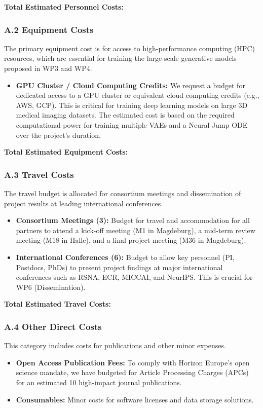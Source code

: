 \textbf{Total Estimated Personnel Costs: }

\subsubsection*{A.2 Equipment Costs}
The primary equipment cost is for access to high-performance computing (HPC) resources, which are essential for training the large-scale generative models proposed in WP3 and WP4.
\begin{itemize}
    \item \textbf{GPU Cluster / Cloud Computing Credits:} We request a budget for dedicated access to a GPU cluster or equivalent cloud computing credits (e.g., AWS, GCP). This is critical for training deep learning models on large 3D medical imaging datasets. The estimated cost is based on the required computational power for training multiple VAEs and a Neural Jump ODE over the project's duration.
\end{itemize}

\textbf{Total Estimated Equipment Costs: }

\subsubsection*{A.3 Travel Costs}
The travel budget is allocated for consortium meetings and dissemination of project results at leading international conferences.
\begin{itemize}
    \item \textbf{Consortium Meetings (3):} Budget for travel and accommodation for all partners to attend a kick-off meeting (M1 in Magdeburg), a mid-term review meeting (M18 in Halle), and a final project meeting (M36 in Magdeburg).
    \item \textbf{International Conferences (6):} Budget to allow key personnel (PI, Postdocs, PhDs) to present project findings at major international conferences such as RSNA, ECR, MICCAI, and NeurIPS. This is crucial for WP6 (Dissemination).
\end{itemize}

\textbf{Total Estimated Travel Costs: }

\subsubsection*{A.4 Other Direct Costs}
This category includes costs for publications and other minor expenses.
\begin{itemize}
    \item \textbf{Open Access Publication Fees:} To comply with Horizon Europe's open science mandate, we have budgeted for Article Processing Charges (APCs) for an estimated 10 high-impact journal publications.
    \item \textbf{Consumables:} Minor costs for software licenses and data storage solutions.
\end{itemize}


